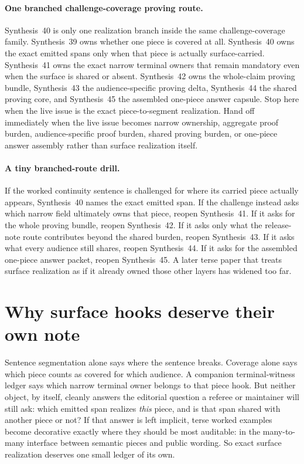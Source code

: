 \documentclass[11pt]{article}
\begin{document}
\paragraph{One branched challenge-coverage proving route.}
Synthesis~40 is only one realization branch inside the same challenge-coverage family. Synthesis~39 owns whether one piece is covered at all. Synthesis~40 owns the exact emitted spans only when that piece is actually \textsf{surface}-carried. Synthesis~41 owns the exact narrow terminal owners that remain mandatory even when the surface is shared or absent. Synthesis~42 owns the whole-claim proving bundle, Synthesis~43 the audience-specific proving delta, Synthesis~44 the shared proving core, and Synthesis~45 the assembled one-piece answer capsule. Stop here when the live issue is the exact piece-to-segment realization. Hand off immediately when the live issue becomes narrow ownership, aggregate proof burden, audience-specific proof burden, shared proving burden, or one-piece answer assembly rather than surface realization itself.

\paragraph{A tiny branched-route drill.}
If the worked continuity sentence is challenged for where its carried piece actually appears, Synthesis~40 names the exact emitted span. If the challenge instead asks which narrow field ultimately owns that piece, reopen Synthesis~41. If it asks for the whole proving bundle, reopen Synthesis~42. If it asks only what the release-note route contributes beyond the shared burden, reopen Synthesis~43. If it asks what every audience still shares, reopen Synthesis~44. If it asks for the assembled one-piece answer packet, reopen Synthesis~45. A later terse paper that treats surface realization as if it already owned those other layers has widened too far.

\section{Why surface hooks deserve their own note}
Sentence segmentation alone says where the sentence breaks.
Coverage alone says which piece counts as covered for which audience.
A companion terminal-witness ledger says which narrow terminal owner belongs to that piece hook.
But neither object, by itself, cleanly answers the editorial question a referee or maintainer will still ask: which emitted span realizes \emph{this} piece, and is that span shared with another piece or not?
If that answer is left implicit, terse worked examples become decorative exactly where they should be most auditable: in the many-to-many interface between semantic pieces and public wording.
So exact surface realization deserves one small ledger of its own.
\end{document}
